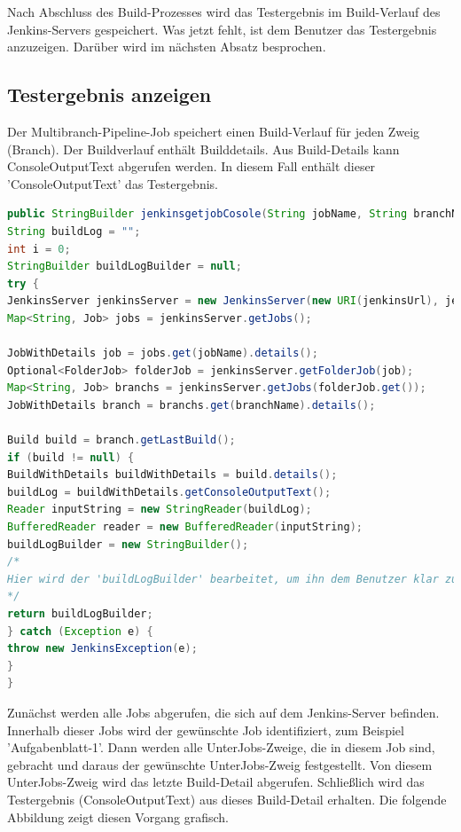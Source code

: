 \documentclass[a4paper,12pt,oneside]{book}
\begin{document}
Nach Abschluss des Build-Prozesses wird das Testergebnis im Build-Verlauf des Jenkins-Servers gespeichert. Was jetzt fehlt, ist dem Benutzer das Testergebnis anzuzeigen. Darüber wird im nächsten Absatz besprochen.
\subsection{Testergebnis anzeigen}
 Der Multibranch-Pipeline-Job speichert einen Build-Verlauf für jeden Zweig (Branch). Der Buildverlauf enthält Builddetails. Aus Build-Details kann ConsoleOutputText abgerufen werden. In diesem Fall enthält dieser 'ConsoleOutputText' das Testergebnis.
 \begin{lstlisting}[language=JAVA,caption=Testergebnis Anfrage ]
public StringBuilder jenkinsgetjobCosole(String jobName, String branchName ) throws JenkinsException {
String buildLog = "";
int i = 0;
StringBuilder buildLogBuilder = null;
try {
JenkinsServer jenkinsServer = new JenkinsServer(new URI(jenkinsUrl), jenkinsUser, jenkinsPassword);
Map<String, Job> jobs = jenkinsServer.getJobs();

JobWithDetails job = jobs.get(jobName).details();
Optional<FolderJob> folderJob = jenkinsServer.getFolderJob(job);
Map<String, Job> branchs = jenkinsServer.getJobs(folderJob.get());
JobWithDetails branch = branchs.get(branchName).details();

Build build = branch.getLastBuild();
if (build != null) {
BuildWithDetails buildWithDetails = build.details();
buildLog = buildWithDetails.getConsoleOutputText();
Reader inputString = new StringReader(buildLog);
BufferedReader reader = new BufferedReader(inputString);
buildLogBuilder = new StringBuilder();  
/*
Hier wird der 'buildLogBuilder' bearbeitet, um ihn dem Benutzer klar zu zeigen.
*/
return buildLogBuilder;
} catch (Exception e) {
throw new JenkinsException(e);
}
}
 \end{lstlisting}
 Zunächst werden alle Jobs abgerufen, die sich auf dem Jenkins-Server befinden. Innerhalb dieser Jobs wird der gewünschte Job identifiziert, zum Beispiel 'Aufgabenblatt-1'. Dann werden alle UnterJobs-Zweige, die in diesem Job sind, gebracht und daraus der gewünschte UnterJobs-Zweig festgestellt. Von diesem  UnterJobs-Zweig wird das letzte Build-Detail abgerufen. Schließlich wird das Testergebnis (ConsoleOutputText) aus dieses Build-Detail erhalten. Die folgende Abbildung zeigt diesen Vorgang grafisch.
\end{document}
